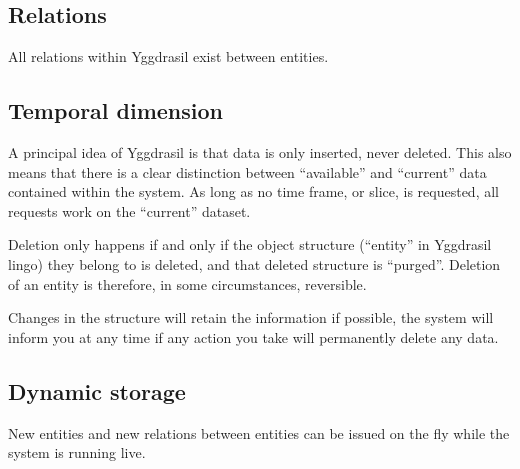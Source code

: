 \documentclass[english,a4paper]{article}
\begin{document}
\subsection{Relations}

All relations within Yggdrasil exist between entities.  

\subsection{Temporal dimension}

A principal idea of Yggdrasil is that data is only inserted, never
deleted.  This also means that there is a clear distinction between
``available'' and ``current'' data contained within the system.
As long as no time frame, or slice, is requested, all requests work on
the ``current'' dataset. 

Deletion only happens if and only if the object structure (``entity''
in Yggdrasil lingo) they belong to is deleted, and that deleted
structure is ``purged''.  Deletion of an entity is therefore, in some
circumstances, reversible.

Changes in the structure will retain the information if possible, the
system will inform you at any time if any action you take will
permanently delete any data.

\subsection{Dynamic storage}

New entities and new relations between entities can be issued on the
fly while the system is running live.  
\end{document}
